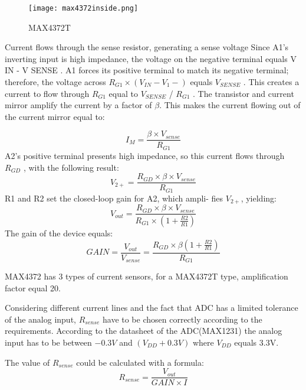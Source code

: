  \begin{figure}[h]
 	\centering
 	\texttt{[image: max4372inside.png]}
 	\caption{MAX4372T \cite{24}}
 	\label{fig: max4372t_inside}
 \end{figure} 
 
 \newpage
 

\cite{23} Current flows through the sense resistor, generating a sense voltage  Since A1’s inverting input is high impedance, the voltage on the negative terminal equals V IN - V SENSE . A1 forces its
positive terminal to match its negative terminal; therefore, the voltage across $R_{G1}\times (V_{IN} - V_{1}-)$ equals $V_{SENSE}$ . This
creates a current to flow through $R_{G1}$ equal to $V_{SENSE}$ /
$R_{G1}$ . The transistor and current mirror amplify the current
by a factor of $\beta$. This makes the current flowing out of the
current mirror equal to: 

 \begin{equation}
I_{M} = \frac{\beta \times V_{sense}}{R_{G1}}
 \end{equation}
 A2’s positive terminal presents high impedance, so this
 current flows through $R_{GD}$ , with the following result:
  \begin{equation}
V_{2+} = \frac{R_{GD} \times \beta \times V_{sense}}{R_{G1}}
  \end{equation}
  R1 and R2 set the closed-loop gain for A2, which ampli-
  fies $V_{2+}$, yielding:
  \begin{equation}
  V_{out} = \frac{R_{GD} \times \beta \times V_{sense}}{R_{G1} \times (1+\frac{R2}{R1})	 }
  \end{equation}
The gain of the device equals:
  \begin{equation}
  GAIN =\frac{V_{out}}{V_{sense}} = \frac{R_{GD} \times \beta (1+\frac{R2}{R1})}{R_{G1}}
  \end{equation}
  
  MAX4372 has 3 types of current sensors, for a MAX4372T type, amplification factor equal 20.
  
  Considering different current lines and the fact that ADC has a limited tolerance of the analog input, $R_{sense}$ have to be chosen correctly according to the requirements. According to the datasheet of the ADC(MAX1231) the analog input has to be between $ -0.3V$ and $(V_{DD} + 0.3V)$ where $V_{DD}$ equals 3.3V.
  
  The value of $R_{sense}$ could be calculated with a formula:
    \begin{equation}
    R_{sense} = \frac{V_{out}}{GAIN \times I}
    \end{equation}
  
